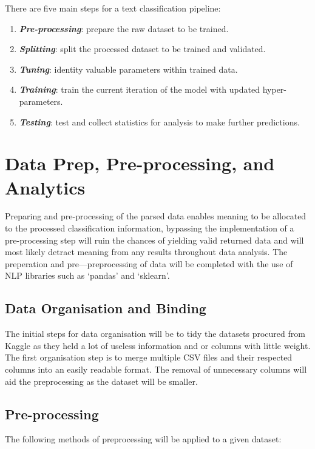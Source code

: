 There are five main steps for a text classification pipeline:

\begin{enumerate}
    \item \textbf{\textit{Pre-processing}}: prepare the raw dataset to be trained.
    \item \textbf{\textit{Splitting}}: split the processed dataset to be trained and validated.
    \item \textbf{\textit{Tuning}}: identity valuable parameters within trained data.
    \item \textbf{\textit{Training}}: train the current iteration of the model with updated hyper-parameters.
    \item \textbf{\textit{Testing}}: test and collect statistics for analysis to make further predictions.
\end{enumerate} \newpage

\section{Data Prep, Pre-processing, and Analytics}

Preparing and pre-processing of the parsed data enables meaning to be allocated to the processed classification information, bypassing the implementation of a pre-processing step will ruin the chances of yielding valid returned data and will most likely detract meaning from any results throughout data analysis. The preperation and pre---preprocessing of data will be completed with the use of NLP libraries such as `pandas' and `sklearn'.

\subsection{Data Organisation and Binding}

The initial steps for data organisation will be to tidy the datasets procured from Kaggle as they held a lot of useless information and or columns with little weight. The first organisation step is to merge multiple CSV files and their respected columns into an easily readable format. The removal of unnecessary columns will aid the preprocessing as the dataset will be smaller.

\subsection{Pre-processing}

The following methods of preprocessing will be applied to a given dataset:

